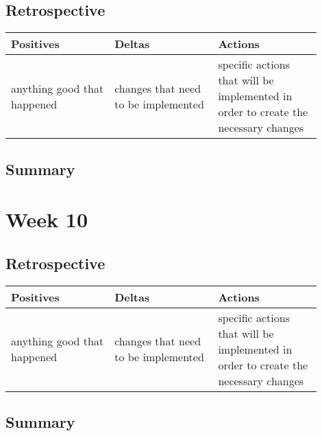 \documentclass[letterpaper,10pt,serif,draftclsnofoot,onecolumn,compsoc,titlepage]{IEEEtran}
\begin{document}
\subsection{Retrospective}


\begin{tabular}{|p{0.3\linewidth}|p{0.3\linewidth}|p{0.3\linewidth}|}
   \hline
   \textbf{Positives} & \textbf{Deltas} & \textbf{Actions}\\ 
   \hline
   anything good that happened & changes that need to be implemented & specific actions that will be implemented in order to create the necessary changes \\
   \hline
\end{tabular}

\subsection{Summary}

\section{Week 10}
\subsection{Retrospective}


\begin{tabular}{|p{0.3\linewidth}|p{0.3\linewidth}|p{0.3\linewidth}|}
   \hline
   \textbf{Positives} & \textbf{Deltas} & \textbf{Actions}\\ 
   \hline
   anything good that happened & changes that need to be implemented & specific actions that will be implemented in order to create the necessary changes \\
   \hline
\end{tabular}

\subsection{Summary}

\newpage


\nocite{*}
\end{document}
